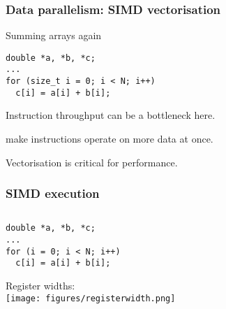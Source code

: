 \documentclass[dvipsnames,presentation,aspectratio=169,14pt]{beamer}
\begin{document}
\begin{frame}[fragile]
  \frametitle{Data parallelism: SIMD vectorisation}

  \begin{exampleblock}{Summing arrays again}
\begin{verbatim}
double *a, *b, *c;
...
for (size_t i = 0; i < N; i++)
  c[i] = a[i] + b[i];
\end{verbatim}

    \vskip 5pt

    Instruction throughput can be a bottleneck here.

    \vskip 3pt

     make instructions operate on more data at once.

    \vskip 3pt
  \end{exampleblock}

  \vskip 8pt

  Vectorisation is critical for  performance.

\end{frame}

\begin{frame}[fragile]
  \frametitle{SIMD execution}
  \vskip -10pt

  \begin{columns}[c]
    \begin{column}{0.5\textwidth}
\begin{verbatim}
double *a, *b, *c;
...
for (i = 0; i < N; i++)
  c[i] = a[i] + b[i];
\end{verbatim}

      \vspace{\baselineskip}
      Register widths:\\[6pt]

      \texttt{[image: figures/registerwidth.png]}
    \end{column}
    \begin{column}{0.5\textwidth}
    \end{column}
  \end{columns}
\end{frame}
\end{document}
